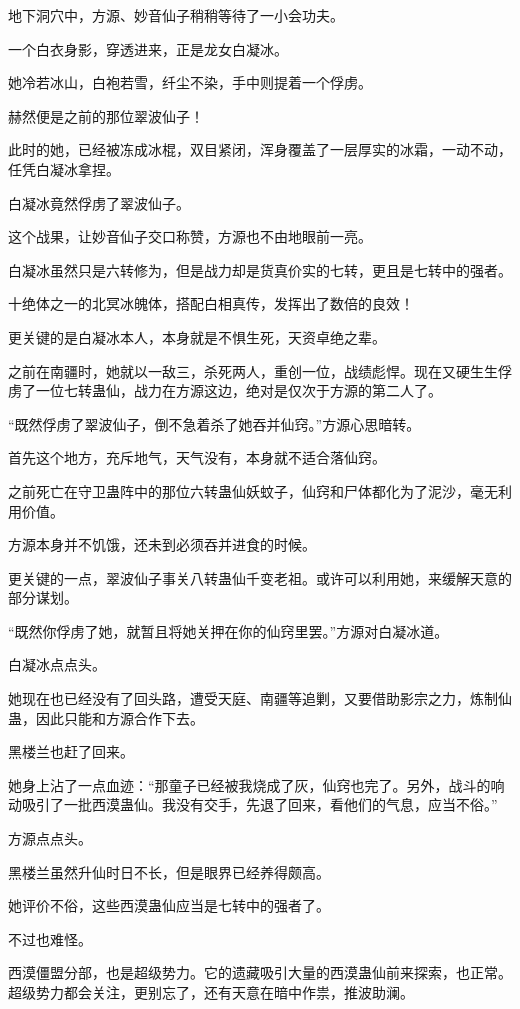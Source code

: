 \begin{this_body}
地下洞穴中，方源、妙音仙子稍稍等待了一小会功夫。

一个白衣身影，穿透进来，正是龙女白凝冰。

她冷若冰山，白袍若雪，纤尘不染，手中则提着一个俘虏。

赫然便是之前的那位翠波仙子！

此时的她，已经被冻成冰棍，双目紧闭，浑身覆盖了一层厚实的冰霜，一动不动，任凭白凝冰拿捏。

白凝冰竟然俘虏了翠波仙子。

这个战果，让妙音仙子交口称赞，方源也不由地眼前一亮。

白凝冰虽然只是六转修为，但是战力却是货真价实的七转，更且是七转中的强者。

十绝体之一的北冥冰魄体，搭配白相真传，发挥出了数倍的良效！

更关键的是白凝冰本人，本身就是不惧生死，天资卓绝之辈。

之前在南疆时，她就以一敌三，杀死两人，重创一位，战绩彪悍。现在又硬生生俘虏了一位七转蛊仙，战力在方源这边，绝对是仅次于方源的第二人了。

“既然俘虏了翠波仙子，倒不急着杀了她吞并仙窍。”方源心思暗转。

首先这个地方，充斥地气，天气没有，本身就不适合落仙窍。

之前死亡在守卫蛊阵中的那位六转蛊仙妖蚊子，仙窍和尸体都化为了泥沙，毫无利用价值。

方源本身并不饥饿，还未到必须吞并进食的时候。

更关键的一点，翠波仙子事关八转蛊仙千变老祖。或许可以利用她，来缓解天意的部分谋划。

“既然你俘虏了她，就暂且将她关押在你的仙窍里罢。”方源对白凝冰道。

白凝冰点点头。

她现在也已经没有了回头路，遭受天庭、南疆等追剿，又要借助影宗之力，炼制仙蛊，因此只能和方源合作下去。

黑楼兰也赶了回来。

她身上沾了一点血迹：“那童子已经被我烧成了灰，仙窍也完了。另外，战斗的响动吸引了一批西漠蛊仙。我没有交手，先退了回来，看他们的气息，应当不俗。”

方源点点头。

黑楼兰虽然升仙时日不长，但是眼界已经养得颇高。

她评价不俗，这些西漠蛊仙应当是七转中的强者了。

不过也难怪。

西漠僵盟分部，也是超级势力。它的遗藏吸引大量的西漠蛊仙前来探索，也正常。超级势力都会关注，更别忘了，还有天意在暗中作祟，推波助澜。


\end{this_body}
